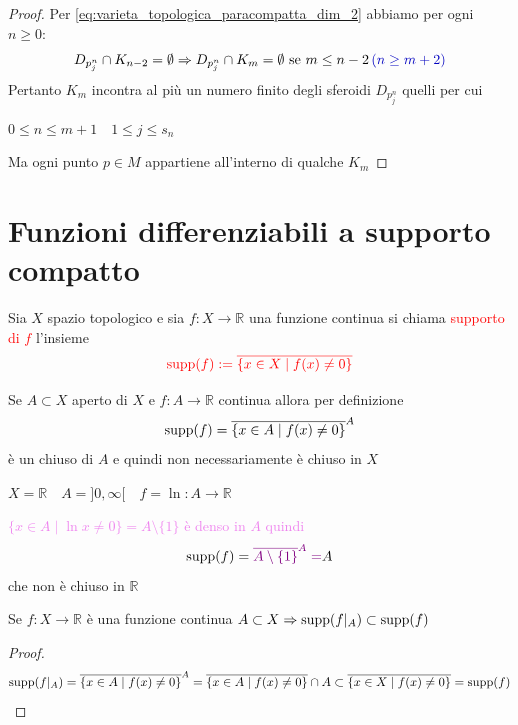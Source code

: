\begin{proof}
        Per \eqref{eq:varieta_topologica_paracompatta_dim_2} abbiamo per ogni $n \geq 0$:
        \[ D_{p_j^n} \cap K_{n-2} = \emptyset \Rightarrow D_{p_j^n} \cap K_{m} = \emptyset \text{ se } m \leq n-2 \, \textcolor{blu}{(n \geq m+2)} \]
        Pertanto $K_m$ incontra al più un numero finito degli sferoidi $D_{p^n_j}$ quelli per cui 
        
        $0 \leq n \leq m+1 \quad 1 \leq j \leq s_n$

        Ma ogni punto $p \in M$ appartiene all'interno di qualche $K_m$

        \end{proof}
    \section{Funzioni differenziabili a supporto compatto}
        \begin{definizione}
        Sia $X$ spazio topologico e sia $f \colon X \to \mathbb{R}$ una funzione continua si chiama \textcolor{red}{supporto di $f$} l'insieme
        \[ \color{red} \operatorname{supp}(f):= \overline{\left\{x \in X \mid f(x) \neq 0 \right\}} \] 
        \end{definizione}
        \begin{osservazione}
        Se $A \subset X$ aperto di $X$ e $f \colon A \to \mathbb{R}$ continua allora per definizione 
        \[ \operatorname{supp}(f) = \overline{\left\{x \in A \mid f(x) \neq 0\right\}}^A \]
        è un chiuso di $A$ e quindi non necessariamente è chiuso in $X$
        \end{osservazione}
        \begin{esempio}
        $X= \mathbb{R} \quad A=]0, \infty[ \quad f=\ln \colon A \to \mathbb{R}$ 

        \textcolor{violet}{$\{x \in A \mid \ln x \neq 0\} = A \setminus \{1\}$ è denso in $A$ quindi}
        \[ \operatorname{supp}(f) = \textcolor{violet}{\overline{A \setminus \{1\}}^A =} A \]
        che non è chiuso in $\mathbb{R}$ 
        \end{esempio}
        \begin{osservazione}
        \mbox{}

        Se $f \colon X \to \mathbb{R}$ è una funzione continua $A \subset X \Rightarrow \operatorname{supp}(f|_A) \subset \operatorname{supp} (f)$
        \begin{proof}
        \[ \operatorname{supp}(f|_A)=\overline{\left\{x \in A \mid f(x) \neq 0\right\}}^A =\overline{\left\{x \in A \mid f(x) \neq 0\right\}}
        \cap A \subset \overline{\left\{x \in X \mid f(x) \neq 0 \right\}} = \operatorname{supp}(f)  \]
        \end{proof}
        \end{osservazione}
